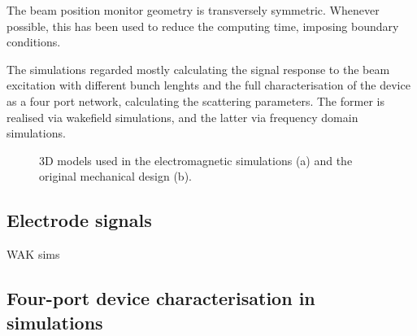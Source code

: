 The beam position monitor geometry is transversely symmetric. Whenever possible, this has been used to reduce the computing time, imposing boundary conditions.

The simulations regarded mostly calculating the signal response to the beam excitation with different bunch lenghts and the full characterisation of the device as a four port network, calculating the scattering parameters. The former is realised via wakefield simulations, and the latter via frequency domain simulations.

\begin{figure}[t]
\centering
{}
\hspace{3mm}
\caption{3D models used in the electromagnetic simulations (a) and the original mechanical design (b). }
\label{CSTvsSTEP_section}
\end{figure}



\subsection[Electrode signals]{Electrode signals}

WAK sims

\subsection[Four-port device characterisation in simulations]{Four-port device characterisation in simulations}

